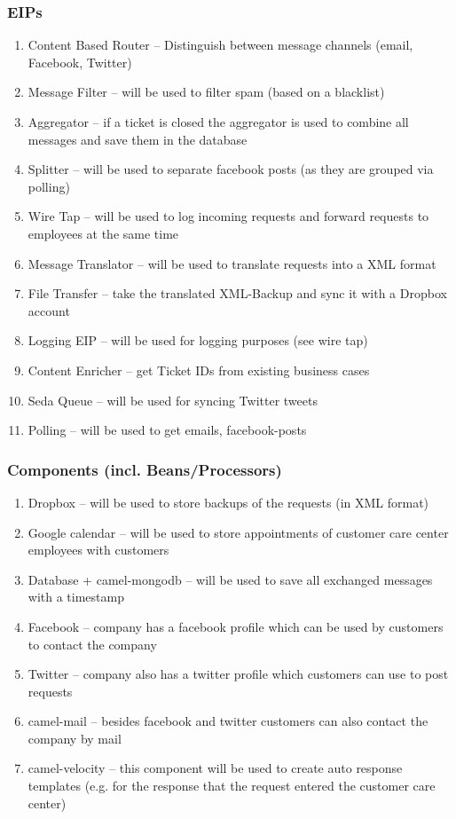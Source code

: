 \subsubsection{EIPs}
\begin{enumerate}
    \item Content Based Router -- Distinguish between message channels (email, Facebook, Twitter)
    \item Message Filter -- will be used to filter spam (based on a blacklist)
    \item Aggregator -- if a ticket is closed the aggregator is used to combine all messages and save them in the database
    \item Splitter -- will be used to separate facebook posts (as they are grouped via polling)
    \item Wire Tap -- will be used to log incoming requests and forward requests to employees at the same time
    \item Message Translator -- will be used to translate requests into a XML format
    \item File Transfer -- take the translated XML-Backup and sync it with a Dropbox account
    \item Logging EIP -- will be used for logging purposes (see wire tap)
    \item Content Enricher -- get Ticket IDs from existing business cases
    \item Seda Queue -- will be used for syncing Twitter tweets
    \item Polling -- will be used to get emails, facebook-posts
\end{enumerate}

\subsubsection{Components (incl. Beans/Processors)}
\begin{enumerate}
    \item Dropbox -- will be used to store backups of the requests (in XML format)
    \item Google calendar -- will be used to store appointments of customer care center employees with customers
    \item Database + camel-mongodb -- will be used to save all exchanged messages with a timestamp
    \item Facebook -- company has a facebook profile which can be used by customers to contact the company
    \item Twitter -- company also has a twitter profile which customers can use to post requests
    \item camel-mail -- besides facebook and twitter customers can also contact the company by mail
    \item camel-velocity -- this component will be used to create auto response templates (e.g. for the response that the request entered the customer care center)
\end{enumerate}

